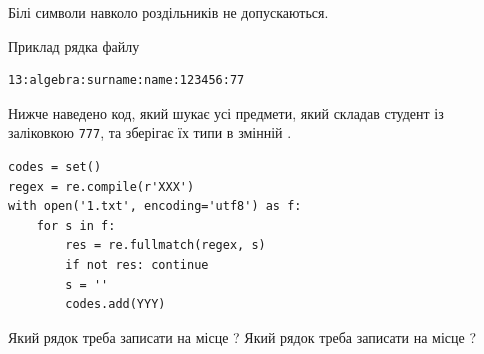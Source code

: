 \documentclass[12pt, ukrainian]{article}
\def\code#1{\Verb!#1!}
\begin{document}
{Білі символи навколо роздільників не допускаються.

Приклад рядка файлу



\begin{verbatim}
13:algebra:surname:name:123456:77
\end{verbatim}


Нижче наведено код, який шукає усі предмети, який складав студент із заліковкою \code{777}, та зберігає їх типи в змінній .



\begin{verbatim}
codes = set()
regex = re.compile(r'XXX')
with open('1.txt', encoding='utf8') as f:
    for s in f:
        res = re.fullmatch(regex, s)
        if not res: continue
        s = ''
        codes.add(YYY)
\end{verbatim}



Який рядок треба записати на місце  ?
Який рядок треба записати на місце  ?\par

}
\end{document}
